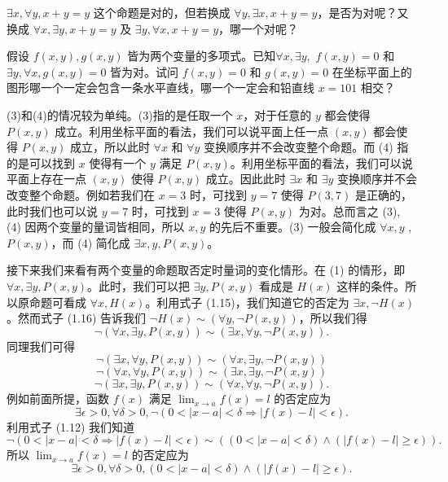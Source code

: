 \begin{question}
\(\exists x,\forall y,x + y = y\) 这个命题是对的，但若换成 \(\forall y,\exists x,x + y = y\)，是否为对呢？又换成 \(\forall x,\exists y,x + y = y\) 及 \(\exists y,\forall x,x + y = y\)，哪一个对呢？
\end{question}

\begin{question}
假设 \(f(x,y),g(x,y)\) 皆为两个变量的多项式。已知$\forall x,\exists y,$ $f(x,y) = 0$ 和 \(\exists y,\forall x,g(x,y) = 0\) 皆为对。试问 \(f(x,y) = 0\) 和 \(g(x,y) = 0\) 在坐标平面上的图形哪一个一定会包含一条水平直线，哪一个一定会和铅直线 \(x = 101\) 相交？
\end{question}

(3)和(4)的情况较为单纯。(3)指的是任取一个 \(x\)，对于任意的 \(y\) 都会使得 \(P(x,y)\) 成立。利用坐标平面的看法，我们可以说平面上任一点 \((x,y)\) 都会使得 \(P(x,y)\) 成立，所以此时 \(\forall x\) 和 \(\forall y\) 变换顺序并不会改变整个命题。而 (4) 指的是可以找到 \(x\) 使得有一个 \(y\) 满足 \(P(x,y)\)。利用坐标平面的看法，我们可以说平面上存在一点 \((x,y)\) 使得 \(P(x,y)\) 成立。因此此时 \(\exists x\) 和 \(\exists y\) 变换顺序并不会改变整个命题。例如若我们在 \(x = 3\) 时，可找到 \(y = 7\) 使得 \(P(3,7)\) 是正确的，此时我们也可以说 \(y = 7\) 时，可找到 \(x = 3\) 使得 \(P(x,y)\) 为对。总而言之 (3), (4) 因两个变量的量词皆相同，所以 \(x,y\) 的先后不重要。(3) 一般会简化成 \(\forall x,y\) , \(P(x,y)\)，而 (4) 简化成 \(\exists x,y,P(x,y)\)。

接下来我们来看有两个变量的命题取否定时量词的变化情形。在 (1) 的情形，即 \( \forall x,\exists y,P(x,y)\)。此时，我们可以把 \( \exists y,P(x,y)\) 看成是 \(H(x)\) 这样的条件。所以原命题可看成 \(\forall x,H(x)\)。利用式子 (1.15)，我们知道它的否定为 \(\exists x,\neg H(x)\)。然而式子 (1.16) 告诉我们 \(\neg H(x) \sim (\forall y,\neg P(x,y))\)，所以我们得
\[
\neg (\forall x,\exists y,P(x,y)) \sim (\exists x,\forall y,\neg P(x,y)).
\]
同理我们可得
\[
\neg (\exists x,\forall y,P(x,y)) \sim (\forall x,\exists y,\neg P(x,y))
\]
\[
\neg (\forall x,\forall y,P(x,y)) \sim (\exists x,\exists y,\neg P(x,y))
\]
\[
\neg (\exists x,\exists y,P(x,y)) \sim (\forall x,\forall y,\neg P(x,y)).
\]
例如前面所提，函数 \(f(x)\) 满足 \(\lim_{x \to a} f(x) = l\) 的否定应为
\[
\exists \epsilon >0,\forall \delta >0, \neg (0 < |x - a| < \delta \Rightarrow |f(x) - l| < \epsilon).
\]
利用式子 (1.12) 我们知道
\[
\neg (0 < |x - a| < \delta \Rightarrow |f(x) - l| < \epsilon) \sim ((0 < |x - a| < \delta) \land (|f(x) - l| \ge \epsilon)).
\]
所以 \(\lim_{x \to a} f(x) = l\) 的否定应为
\[
\exists \epsilon >0, \forall \delta >0, (0 < |x - a| < \delta) \land (|f(x) - l| \ge \epsilon).
\]

